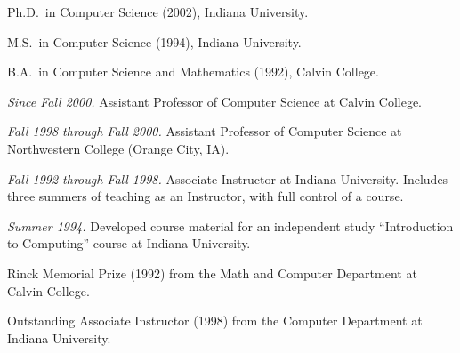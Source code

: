 \documentclass[ComputerScience]{vita}
\begin{document}
\begin{vita}



\begin{Degrees}
\item Ph.D.\ in Computer Science (2002), Indiana University.
\item M.S.\ in Computer Science (1994), Indiana University.
\item B.A.\ in Computer Science and Mathematics (1992), Calvin College.
\end{Degrees}




\begin{Experience}

\item \emph{Since Fall 2000.}  Assistant Professor of Computer
  Science at Calvin College.  %

\item \emph{Fall 1998 through Fall 2000.}  Assistant Professor of
  Computer Science at Northwestern College (Orange City, IA).  %

\item \emph{Fall 1992 through Fall 1998.}  Associate Instructor at
  Indiana University.  Includes three summers of teaching as an
  Instructor, with full control of a course.

\item \emph{Summer 1994.}  Developed course material for an
  independent study ``Introduction to Computing'' course at Indiana
  University.

\end{Experience}




\begin{Honors}

\item Rinck Memorial Prize (1992) from the Math and Computer
  Department at Calvin College.

\item Outstanding Associate Instructor (1998) from the Computer
  Department at Indiana University.

\end{Honors}


\newpage



\begin{Publications}


\end{Publications}
\end{vita}
\end{document}
